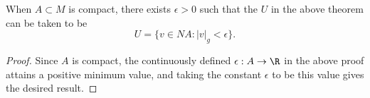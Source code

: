 \begin{cor}
    When $A\subset M$ is compact, there exists $\epsilon>0$ such that the $U$ in the above theorem can be taken to be
    $$U=\{v\in NA:|v|_g<\epsilon\}.$$
\end{cor}

\begin{proof}
Since $A$ is compact, the continuously defined $\epsilon:A\to\R$ in the above proof attains a positive minimum value, and taking the constant $\epsilon$ to be this value gives the desired result.
\end{proof}












